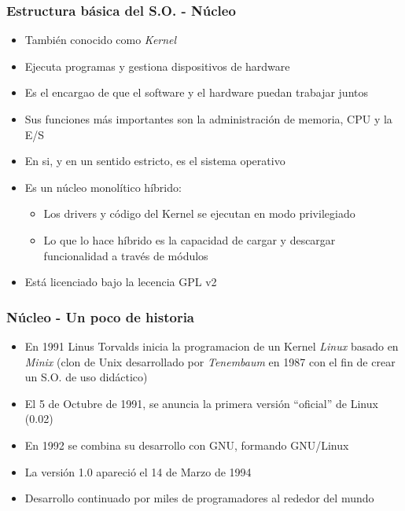 \begin{frame}
	\frametitle{Estructura básica del S.O. - Núcleo}
	\begin{itemize}
		\item También conocido como \textit{Kernel}
		\item Ejecuta programas y gestiona dispositivos de hardware
		\item Es el encargao de que el software y el hardware puedan trabajar juntos
		\item Sus funciones más importantes son la administración de memoria, CPU y la E/S
		\item En si, y en un sentido estricto, es el sistema operativo
		\item Es un núcleo monolítico híbrido:
		\begin{itemize}
			\item Los drivers y código del Kernel se ejecutan en modo privilegiado
			\item Lo que lo hace híbrido es la capacidad de cargar y descargar funcionalidad a través de módulos
		\end{itemize}
		\item Está licenciado bajo la lecencia GPL v2
	\end{itemize}
\end{frame}

\begin{frame}
	\frametitle{Núcleo - Un poco de historia}
	\begin{itemize}
		\item En 1991 Linus Torvalds inicia la programacion de un Kernel \textit{Linux} basado en \textit{Minix} (clon de Unix desarrollado por \emph{Tenembaum} en 1987 con el fin de crear un S.O. de uso didáctico)
		\item El 5 de Octubre de 1991, se anuncia la primera versión ``oficial'' de Linux (0.02)
		\item En 1992 se combina su desarrollo con GNU, formando GNU/Linux
		\item La versión 1.0 apareció el 14 de Marzo de 1994
		\item Desarrollo continuado por miles de programadores al rededor del mundo
	\end{itemize}
\end{frame}

